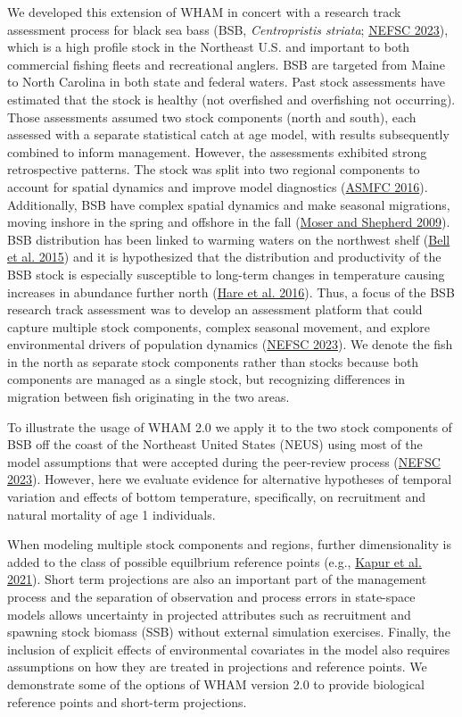 \documentclass[
]{article}
\begin{document}
We developed this extension of WHAM in concert with a research track assessment process for black sea bass (BSB, \textit{Centropristis striata}; \protect\hyperlink{ref-nefsc23}{NEFSC 2023}), which is a high profile stock in the Northeast U.S. and important to both commercial fishing fleets and recreational anglers. BSB are targeted from Maine to North Carolina in both state and federal waters. Past stock assessments have estimated that the stock is healthy (not overfished and overfishing not occurring). Those assessments assumed two stock components (north and south), each assessed with a separate statistical catch at age model, with results subsequently combined to inform management. However, the assessments exhibited strong retrospective patterns. The stock was split into two regional components to account for spatial dynamics and improve model diagnostics (\protect\hyperlink{ref-asmfc16}{ASMFC 2016}). Additionally, BSB have complex spatial dynamics and make seasonal migrations, moving inshore in the spring and offshore in the fall (\protect\hyperlink{ref-mosershepherd09}{Moser and Shepherd 2009}). BSB distribution has been linked to warming waters on the northwest shelf (\protect\hyperlink{ref-belletal15}{Bell et al. 2015}) and it is hypothesized that the distribution and productivity of the BSB stock is especially susceptible to long-term changes in temperature causing increases in abundance further north (\protect\hyperlink{ref-hareetal16}{Hare et al. 2016}). Thus, a focus of the BSB research track assessment was to develop an assessment platform that could capture multiple stock components, complex seasonal movement, and explore environmental drivers of population dynamics (\protect\hyperlink{ref-nefsc23}{NEFSC 2023}). We denote the fish in the north as separate stock components rather than stocks because both components are managed as a single stock, but recognizing differences in migration between fish originating in the two areas.

To illustrate the usage of WHAM 2.0 we apply it to the two stock components of BSB off the coast of the Northeast United States (NEUS) using most of the model assumptions that were accepted during the peer-review process (\protect\hyperlink{ref-nefsc23}{NEFSC 2023}). However, here we evaluate evidence for alternative hypotheses of temporal variation and effects of bottom temperature, specifically, on recruitment and natural mortality of age 1 individuals.

When modeling multiple stock components and regions, further dimensionality is added to the class of possible equilbrium reference points (e.g., \protect\hyperlink{ref-kapuretal21}{Kapur et al. 2021}). Short term projections are also an important part of the management process and the separation of observation and process errors in state-space models allows uncertainty in projected attributes such as recruitment and spawning stock biomass (SSB) without external simulation exercises. Finally, the inclusion of explicit effects of environmental covariates in the model also requires assumptions on how they are treated in projections and reference points. We demonstrate some of the options of WHAM version 2.0 to provide biological reference points and short-term projections.
\end{document}
